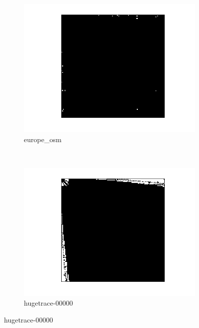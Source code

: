 \documentclass[conference]{IEEEtran}
\begin{document}
\begin{figure}[h!]
	\begin{subfigure}{0.40\linewidth}
		\centering
		\includegraphics[width=\linewidth]{model_images/europe_osm}
		\caption{europe\_osm}
		\label{dat:europe_osm}
	\end{subfigure}
	~
	\begin{subfigure}{0.40\linewidth}
		\centering
		\includegraphics[width=\linewidth]{model_images/hugetrace-00000}
		\caption{hugetrace-00000}
		\label{dat:hugetrace-00000}
	\end{subfigure}


\end{figure}
\end{document}
